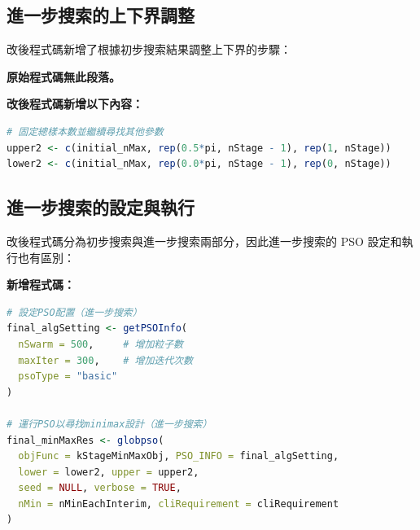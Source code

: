 \subsection{進一步搜索的上下界調整}
改後程式碼新增了根據初步搜索結果調整上下界的步驟：

\textbf{原始程式碼無此段落。}

\textbf{改後程式碼新增以下內容：}
\begin{lstlisting}[language=R]
# 固定總樣本數並繼續尋找其他參數
upper2 <- c(initial_nMax, rep(0.5*pi, nStage - 1), rep(1, nStage))
lower2 <- c(initial_nMax, rep(0.0*pi, nStage - 1), rep(0, nStage))
\end{lstlisting}

\subsection{進一步搜索的設定與執行}
改後程式碼分為初步搜索與進一步搜索兩部分，因此進一步搜索的 PSO 設定和執行也有區別：


\textbf{新增程式碼：}
\begin{lstlisting}[language=R]
# 設定PSO配置（進一步搜索）
final_algSetting <- getPSOInfo(
  nSwarm = 500,     # 增加粒子數
  maxIter = 300,    # 增加迭代次數
  psoType = "basic" 
)

# 運行PSO以尋找minimax設計（進一步搜索）
final_minMaxRes <- globpso(
  objFunc = kStageMinMaxObj, PSO_INFO = final_algSetting, 
  lower = lower2, upper = upper2, 
  seed = NULL, verbose = TRUE,
  nMin = nMinEachInterim, cliRequirement = cliRequirement
)
\end{lstlisting}




